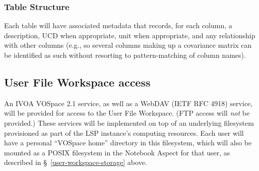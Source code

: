 \subsubsection{Table Structure}\label{table-structure}

Each table will have associated metadata that records, for each column, a
description, UCD when appropriate, unit when appropriate, and any relationship
with other columns (e.g., so several columns making up a covariance matrix can
be identified as such without resorting to pattern-matching of column names).

\subsection{User File Workspace access}\label{user-workspace-access}

An IVOA VOSpace 2.1 service, as well as a WebDAV (IETF RFC 4918) service, will be provided for access to the User File Workspace.
(FTP access will \emph{not} be provided.)
These services will be implemented on top of an underlying filesystem provisioned as part of the LSP instance's computing resources.
Each user will have a personal ``VOSpace home'' directory in this filesystem, which will also be mounted as a POSIX filesystem in the Notebook Aspect for that user, as described in \S~\ref{user-workspace-storage} above.
